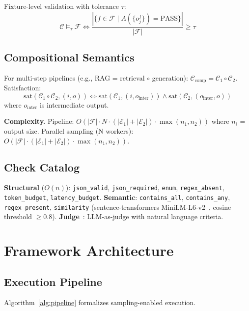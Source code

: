 \documentclass[sigconf]{acmart}
\begin{document}
Fixture-level validation with tolerance \( \tau \):
\[
\mathcal{C} \models_\tau \mathcal{F} \iff \frac{|\{f \in \mathcal{F} \mid A(\{o_j^f\}) = \text{PASS}\}|}{|\mathcal{F}|} \geq \tau
\]

\subsection{Compositional Semantics}

For multi-step pipelines (e.g., RAG = retrieval \(\circ\) generation): \( \mathcal{C}_{\text{comp}} = \mathcal{C}_1 \circ \mathcal{C}_2 \). Satisfaction:
\[
\text{sat}(\mathcal{C}_1 \circ \mathcal{C}_2, (i, o)) \iff \text{sat}(\mathcal{C}_1, (i, o_{\text{inter}})) \wedge \text{sat}(\mathcal{C}_2, (o_{\text{inter}}, o))
\]
where \( o_{\text{inter}} \) is intermediate output.

\textbf{Complexity.} Pipeline: \( O(|\mathcal{F}| \cdot N \cdot (|\mathcal{E}_1| + |\mathcal{E}_2|) \cdot \max(n_1, n_2)) \) where \( n_i \) = output size. Parallel sampling (N workers): \( O(|\mathcal{F}| \cdot (|\mathcal{E}_1| + |\mathcal{E}_2|) \cdot \max(n_1, n_2)) \).

\subsection{Check Catalog}

\textbf{Structural} (\( O(n) \)): \texttt{json\_valid}, \texttt{json\_required}, \texttt{enum}, \texttt{regex\_absent}, \texttt{token\_budget}, \texttt{latency\_budget}. \textbf{Semantic}: \texttt{contains\_all}, \texttt{contains\_any}, \texttt{regex\_present}, \texttt{similarity} (sentence-transformers MiniLM-L6-v2~\cite{reimers2019sentencebert}, cosine threshold \( \geq 0.8 \)). \textbf{Judge}~\cite{zheng2023judging}: LLM-as-judge with natural language criteria.

\section{Framework Architecture}

\subsection{Execution Pipeline}

Algorithm~\ref{alg:pipeline} formalizes sampling-enabled execution.
\end{document}
